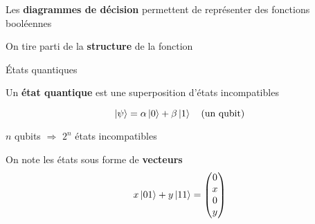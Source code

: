 \begin{frame}
    Les \textbf{diagrammes de décision} permettent de représenter des fonctions booléennes

    \vspace{1em}
    \begin{center}

    \vspace{1em}

    On tire parti de la \textbf{structure} de la fonction
    \end{center}
\end{frame}

\begin{frame}{États quantiques}

    Un \textbf{état quantique} est une superposition d'états incompatibles

    $$\ket{\psi} = \alpha \ket{0} + \beta \ket{1} \quad \text{(un qubit)}$$

    \pause
    \begin{center}
        $n$ qubits $\Rightarrow$ $2^n$ états incompatibles
    \end{center}
On note les états sous forme de \textbf{vecteurs}
$$x \ket {01} + y \ket {11} = \begin{pmatrix}
    0 \\ x \\ 0 \\ y
\end{pmatrix}$$
\end{frame}

